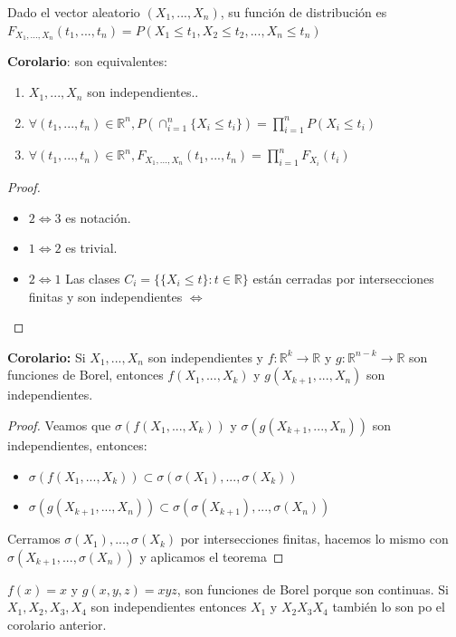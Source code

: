 \documentclass{apuntes}
\begin{document}
\begin{defn}
Dado el vector aleatorio $(X_1,...,X_n)$, su función de distribución es $F_{X_1,...,X_n}(t_1,...,t_n)=P(X_1 \leq t_1, X_2 \leq t_2,...,X_n \leq t_n)$
\end{defn}

\textbf{Corolario}: son equivalentes:
\begin{enumerate}
\item $X_1,...,X_n$ son independientes..
\item $\forall(t_1,...,t_n) \in \mathbb{R}^n, P(\cap_{i=1}^n \{X_i \leq t_i\})=\prod_{i=1}^{n}P(X_i \leq t_i)$
\item $\forall(t_1,...,t_n) \in \mathbb{R}^n, F_{X_1,...,X_n}(t_1,...,t_n)=\prod_{i=1}^{n}F_{X_i}(t_i)$
\end{enumerate}

\begin{proof}
\begin{itemize}
\item $2 \Leftrightarrow 3$ es notación.
\item $1 \Leftrightarrow 2$ es trivial.
\item $2 \Leftrightarrow 1$ Las clases $C_i=\{\{X_i \leq t\}:t \in \mathbb{R}\}$ están cerradas por intersecciones finitas y son independientes $\Leftrightarrow$ 
\end{itemize}
\end{proof}

\textbf{Corolario:} Si $X_1,...,X_n$ son independientes y $f:\mathbb{R}^k \rightarrow \mathbb{R}$ y $g:\mathbb{R}^{n-k}\rightarrow \mathbb{R}$ son funciones de Borel, entonces $f(X_1,...,X_k)$ y $g(X_{k+1},...,X_n)$ son independientes.

\begin{proof}
Veamos que $\sigma(f(X_1,...,X_k))$ y $\sigma(g(X_{k+1},...,X_n))$ son independientes, entonces:
\begin{itemize}
\item $\sigma(f(X_1,...,X_k)) \subset \sigma(\sigma(X_1),...,\sigma(X_k))$
\item $\sigma(g(X_{k+1},...,X_n)) \subset \sigma(\sigma(X_{k+1}),...,\sigma(X_n))$
\end{itemize}

Cerramos $\sigma(X_1),...,\sigma(X_k)$ por intersecciones finitas, hacemos lo mismo con $\sigma(X_{k+1},...,\sigma(X_n))$ y aplicamos el teorema 
\end{proof}

\begin{example}
$f(x)=x$ y $g(x,y,z)=xyz$, son funciones de Borel porque son continuas. Si $X_1, X_2, X_3, X_4$ son independientes entonces $X_1$ y $X_2X_3X_4$ también lo son po el corolario anterior. 
\end{example}
\end{document}
